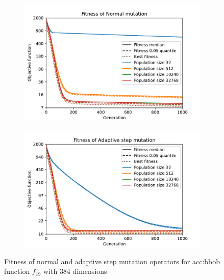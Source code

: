 \begin{figure}
    \begin{subfigure}[t]{0.48\textwidth}
        \includegraphics[width=\textwidth]{img/runs/fitness_es_mutation_AddFromNormal_with_legend.pdf}
    \end{subfigure}
    \hfill
    \begin{subfigure}[t]{0.48\textwidth}
        \includegraphics[width=\textwidth]{img/runs/fitness_es_mutation_AdaptiveStep_with_legend.pdf}
    \end{subfigure}
    \caption[Fitness of mutation operators]{Fitness of normal and adaptive step mutation operators for \acrshort*{acc:bbob} function $f_{19}$ with $384$ dimensions}
    \label{fig:esmutfitness}
\end{figure}

